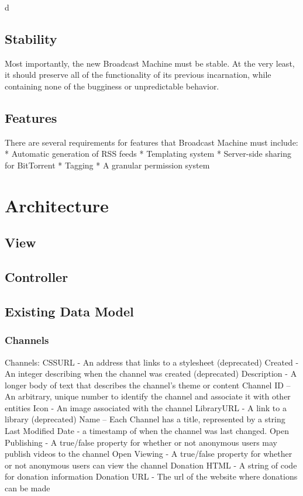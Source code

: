 d\documentclass[a4paper,12pt]{report}
\begin{document}
\section{Stability}

	Most importantly, the new Broadcast Machine must be stable. 
At the very least, it should preserve all of the functionality of its previous incarnation, while containing none of the bugginess or unpredictable behavior. 

\section{Features}
There are several requirements for features that Broadcast Machine must include:
 * Automatic generation of RSS feeds
 * Templating system
 * Server-side sharing for BitTorrent
 * Tagging
 * A granular permission system

\chapter{Architecture}

\section{View}

\section{Controller}

\section{Existing Data Model}

\subsection{Channels}
Channels:
	CSSURL - An address that links to a stylesheet (deprecated)
	Created - An integer describing when the channel was created (deprecated)
	Description - A longer body of text that describes the channel's theme or content
	Channel ID – An arbitrary, unique number to identify the channel and  associate it with other entities
	Icon - An image associated with the channel
	LibraryURL - A link to a library (deprecated)
	Name – Each Channel has a title, represented by a string
	Last Modified Date - a timestamp of when the channel was last changed.
	Open Publishing - A true/false property for whether or not anonymous users may publish videos to the channel
	Open Viewing - A true/false property for whether or not anonymous users can view the channel
	Donation HTML - A string of code for donation information
	Donation URL - The url of the website where donations can be made 
\end{document}
